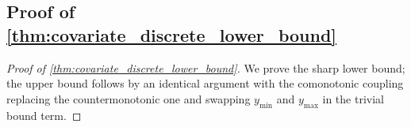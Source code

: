 \iffalse
\subsection{Proof of \cref{thm:covariate_discrete_lower_bound}}

\begin{proof}[Proof of \cref{thm:covariate_discrete_lower_bound}]
We prove the sharp lower bound; the upper bound follows by an identical argument with the comonotonic coupling replacing the countermonotonic one and swapping $y_{\min}$ and $y_{\max}$ in the trivial bound term.


\end{proof}
